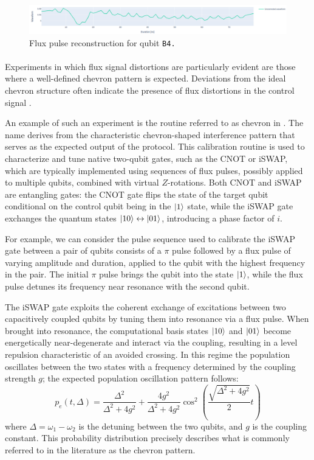 \begin{figure}[h!]
    \centering
    \includegraphics[width=\textwidth]{figures/png/Cryoscope/flux_B4.png}
    \caption{Flux pulse reconstruction for qubit \tt{B4}.}
    \label{fig:flux:B4}
\end{figure} 

\paragraph{}
Experiments in which flux signal distortions are particularly evident are those where a well-defined chevron pattern is expected. 
Deviations from the ideal chevron structure often indicate the presence of flux distortions in the control signal \cite{Langford2017}.

An example of such an experiment is the routine referred to as chevron in \Qibocal. The name derives from the characteristic chevron-shaped interference pattern that serves as the expected output of the protocol.
This calibration routine is used to characterize and tune native two-qubit gates, such as the CNOT or iSWAP, which are typically implemented using sequences of flux pulses, possibly applied to multiple qubits, combined with virtual $Z$-rotations.
Both CNOT and iSWAP are entangling gates: the CNOT gate flips the state of the target qubit conditional on the control qubit being in the $\ket{1}$ state, while the iSWAP gate exchanges the quantum states $\ket{10} \leftrightarrow \ket{01}$, introducing a phase factor of $i$.

For example, we can consider the pulse sequence used to calibrate the iSWAP gate between a pair of qubits consists of a $\pi$ pulse followed by a flux pulse of varying amplitude and duration, applied to the qubit with the highest frequency in the pair. 
The initial $\pi$ pulse brings the qubit into the state $\ket{1}$, while the flux pulse detunes its frequency near resonance with the second qubit. 

The iSWAP gate exploits the coherent exchange of excitations between two capacitively coupled qubits by tuning them into resonance via a flux pulse. 
When brought into resonance, the computational basis states $\ket{10}$ and $\ket{01}$ become energetically near-degenerate and interact via the coupling, resulting in a level repulsion characteristic of an avoided crossing.
In this regime the population oscillates between the two states with a frequency determined by the coupling strength $g$; the expected population oscillation pattern follows:
\begin{equation}
    p_e(t, \Delta) = \frac{\Delta^2}{\Delta^2 + 4g^2} + \frac{4g^2}{\Delta^2 + 4g^2} \cos^2\left(\frac{\sqrt{\Delta^2 + 4g^2}}{2}t\right)
\end{equation}
where $\Delta = \omega_1 - \omega_2$ is the detuning between the two qubits, and $g$ is the coupling constant. This probability distribution precisely describes what is commonly referred to in the literature as the chevron pattern.

